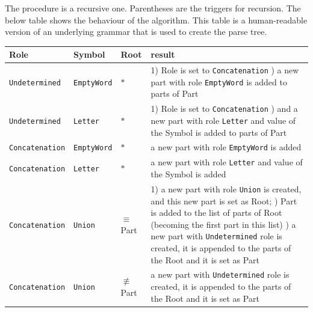 \documentclass{article}
\begin{document}
The procedure is a recursive one. Parentheses are the triggers for recursion. The below table shows
the behaviour of the algorithm. This table is a human-readable version of an underlying grammar that
is used to create the parse tree.

\vspace{10pt} \noindent
\begin{tabularx}{\textwidth}{l|l|l|X}

Role & Symbol & Root & result \\ \hline

\verb|Undetermined| & \verb|EmptyWord| & $*$ &

1) Role is set to \verb|Concatenation| \newline
2) a new part with role \verb|EmptyWord| is added to parts of Part \\

\verb|Undetermined| & \verb|Letter| & $*$ &

1) Role is set to \verb|Concatenation| \newline
2) and a new part with role \verb|Letter| and value of the Symbol is added to parts of Part \\



\verb|Concatenation| & \verb|EmptyWord| & $*$ &

a new part with role \verb|EmptyWord| is added \\

\verb|Concatenation| & \verb|Letter| & $*$ &

a new part with role \verb|Letter| and value of the Symbol is added \\

\verb|Concatenation| & \verb|Union| & $\equiv$Part &

1) a new part with role \verb|Union| is created, and this new part is set as Root; \newline
2) Part is added to the list of parts of Root (becoming the first part in this list) \newline
3) a new part with \verb|Undetermined| role is created, it is appended to the parts of the Root and
it is set as Part \\

\verb|Concatenation| & \verb|Union| & $\not\equiv$Part &

a new part with \verb|Undetermined| role is created, it is appended to the parts of the Root and
it is set as Part \\


\end{tabularx}
\end{document}
